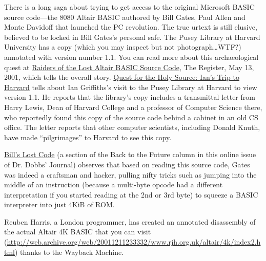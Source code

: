 There is a long saga about trying to get access to the original
Microsoft BASIC source code---the 8080 Altair BASIC authored by Bill
Gates, Paul Allen and Monte Davidoff that launched the PC revolution.
The true urtext is still elusive, believed to be locked in Bill Gates's
personal safe.
The Pusey Library at Harvard University has a copy (which you may
inspect but not photograph\ldots{}WTF?) annotated with version number
1.1.
You can read more about this archaeological quest at
\href{http://www.theregister.co.uk/2001/05/13/raiders_of_the_lost_altair/}{Raiders
of the Lost Altair BASIC Source Code}, The Register, May 13, 2001,
which tells the overall story.
\href{http://www.interact-sw.co.uk/altair/other\%20versions/ian.htm}{Quest
for the Holy Source: Ian's Trip to Harvard} tells about Ian
Griffiths's visit to the Pusey Library at Harvard to view version
1.1.
He reports that the library's copy includes a transmittal letter from
Harry Lewis, Dean of Harvard College and a professor of Computer
Science there, who reportedly found this copy of the source code behind
a cabinet in an old CS office.
The letter reports that other computer scientists, including Donald
Knuth, have made ``pilgrimages'' to Harvard to see this copy.

\href{http://www.drdobbs.com/back-to-the-future/184404733}{Bill's
  Lost Code} (a section of the Back to the Future column in this online
issue of Dr. Dobbs' Journal) observes that based on reading this source
code, Gates was indeed a craftsman and hacker, pulling nifty tricks such
as jumping into the middle of an instruction (because a multi-byte
opcode had a different interpretation if you started reading at the 2nd
or 3rd byte) to squeeze a BASIC interpreter into just 4KiB of ROM.


Reuben Harris, a London programmer, has created an
annotated
disassembly of the actual Altair 4K BASIC 
that you can visit (\url{http://web.archive.org/web/20011211233332/www.rjh.org.uk/altair/4k/index2.html}) thanks to the
Wayback Machine.
